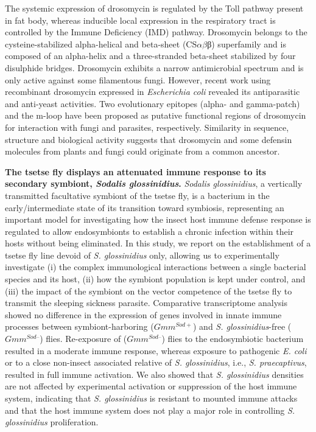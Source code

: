 \documentclass[11pt]{article}
\begin{document}
\begin{sloppypar}
The systemic expression of drosomycin is regulated by the Toll pathway present in fat body, whereas inducible local expression in the respiratory tract is controlled by the Immune Deficiency (IMD) pathway. 
Drosomycin belongs to the cysteine-stabilized alpha-helical and beta-sheet (CS$\alpha\beta$β) superfamily and is composed of an alpha-helix and a three-stranded beta-sheet stabilized by four disulphide bridges. 
Drosomycin exhibits a narrow antimicrobial spectrum and is only active against some filamentous fungi. 
However, recent work using recombinant drosomycin expressed in \textit{Escherichia coli} revealed its antiparasitic and anti-yeast activities. 
Two evolutionary epitopes (alpha- and gamma-patch) and the m-loop have been proposed as putative functional regions of drosomycin for interaction with fungi and parasites, respectively. 
Similarity in sequence, structure and biological activity suggests that drosomycin and some defensin molecules from plants and fungi could originate from a common ancestor.
\par
\textbf{The tsetse fly displays an attenuated immune response to its secondary symbiont, \textit{Sodalis glossinidius}.}
\textit{Sodalis glossinidius}, a vertically transmitted facultative symbiont of the tsetse fly, is a bacterium in the early/intermediate state of its transition toward symbiosis, representing an important model for investigating how the insect host immune defense response is regulated to allow endosymbionts to establish a chronic infection within their hosts without being eliminated. 
In this study, we report on the establishment of a tsetse fly line devoid of \textit{S. glossinidius} only, allowing us to experimentally investigate (i) the complex immunological interactions between a single bacterial species and its host, (ii) how the symbiont population is kept under control, and (iii) the impact of the symbiont on the vector competence of the tsetse fly to transmit the sleeping sickness parasite. 
Comparative transcriptome analysis showed no difference in the expression of genes involved in innate immune processes between symbiont-harboring ($Gmm^{Sod+}$) and \textit{S. glossinidius}-free ($Gmm^{Sod–}$) flies. 
Re-exposure of ($Gmm^{Sod–}$) flies to the endosymbiotic bacterium resulted in a moderate immune response, whereas exposure to pathogenic \textit{E. coli} or to a close non-insect associated relative of \textit{S. glossinidius}, i.e., \textit{S. praecaptivus}, resulted in full immune activation. 
We also showed that \textit{S. glossinidius} densities are not affected by experimental activation or suppression of the host immune system, indicating that \textit{S. glossinidius} is resistant to mounted immune attacks and that the host immune system does not play a major role in controlling \textit{S. glossinidius} proliferation. 

\end{sloppypar}
\end{document}
